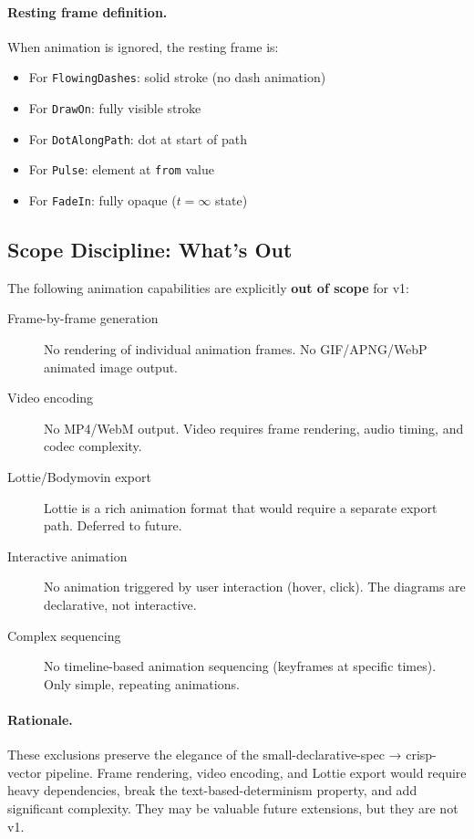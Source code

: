 \paragraph{Resting frame definition.}
When animation is ignored, the resting frame is:
\begin{itemize}
  \item For \texttt{FlowingDashes}: solid stroke (no dash animation)
  \item For \texttt{DrawOn}: fully visible stroke
  \item For \texttt{DotAlongPath}: dot at start of path
  \item For \texttt{Pulse}: element at \texttt{from} value
  \item For \texttt{FadeIn}: fully opaque ($t=\infty$ state)
\end{itemize}

\subsection{Scope Discipline: What's Out}

The following animation capabilities are explicitly \textbf{out of scope} for v1:

\begin{description}
  \item[Frame-by-frame generation] No rendering of individual animation frames. No GIF/APNG/WebP animated image output.
  
  \item[Video encoding] No MP4/WebM output. Video requires frame rendering, audio timing, and codec complexity.
  
  \item[Lottie/Bodymovin export] Lottie is a rich animation format that would require a separate export path. Deferred to future.
  
  \item[Interactive animation] No animation triggered by user interaction (hover, click). The diagrams are declarative, not interactive.
  
  \item[Complex sequencing] No timeline-based animation sequencing (keyframes at specific times). Only simple, repeating animations.
\end{description}

\paragraph{Rationale.}
These exclusions preserve the elegance of the small-declarative-spec → crisp-vector pipeline. Frame rendering, video encoding, and Lottie export would require heavy dependencies, break the text-based-determinism property, and add significant complexity. They may be valuable future extensions, but they are not v1.
